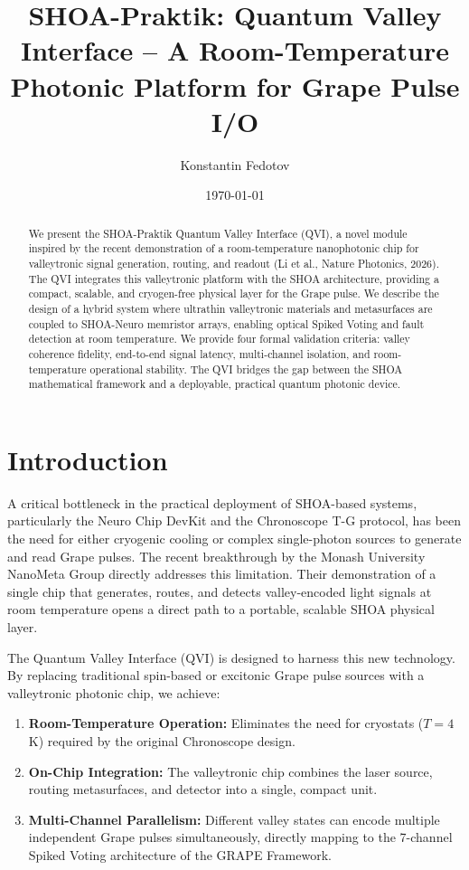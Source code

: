 \documentclass[12pt]{article}
\title{SHOA-Praktik: Quantum Valley Interface -- A Room-Temperature Photonic Platform for Grape Pulse I/O}
\author{Konstantin Fedotov}
\date{\today}
\begin{document}
\maketitle

\begin{abstract}
We present the SHOA-Praktik Quantum Valley Interface (QVI), a novel module inspired by the recent demonstration of a room-temperature nanophotonic chip for valleytronic signal generation, routing, and readout (Li et al., Nature Photonics, 2026). The QVI integrates this valleytronic platform with the SHOA architecture, providing a compact, scalable, and cryogen-free physical layer for the Grape pulse. We describe the design of a hybrid system where ultrathin valleytronic materials and metasurfaces are coupled to SHOA-Neuro memristor arrays, enabling optical Spiked Voting and fault detection at room temperature. We provide four formal validation criteria: valley coherence fidelity, end-to-end signal latency, multi-channel isolation, and room-temperature operational stability. The QVI bridges the gap between the SHOA mathematical framework and a deployable, practical quantum photonic device.
\end{abstract}

\section{Introduction}
A critical bottleneck in the practical deployment of SHOA-based systems, particularly the Neuro Chip DevKit and the Chronoscope T-G protocol, has been the need for either cryogenic cooling or complex single-photon sources to generate and read Grape pulses. The recent breakthrough by the Monash University NanoMeta Group directly addresses this limitation. Their demonstration of a single chip that generates, routes, and detects valley-encoded light signals at room temperature opens a direct path to a portable, scalable SHOA physical layer.

The Quantum Valley Interface (QVI) is designed to harness this new technology. By replacing traditional spin-based or excitonic Grape pulse sources with a valleytronic photonic chip, we achieve:
\begin{enumerate}
    \item \textbf{Room-Temperature Operation:} Eliminates the need for cryostats ($T=4$ K) required by the original Chronoscope design.
    \item \textbf{On-Chip Integration:} The valleytronic chip combines the laser source, routing metasurfaces, and detector into a single, compact unit.
    \item \textbf{Multi-Channel Parallelism:} Different valley states can encode multiple independent Grape pulses simultaneously, directly mapping to the 7-channel Spiked Voting architecture of the GRAPE Framework.
\end{enumerate}
\end{document}
